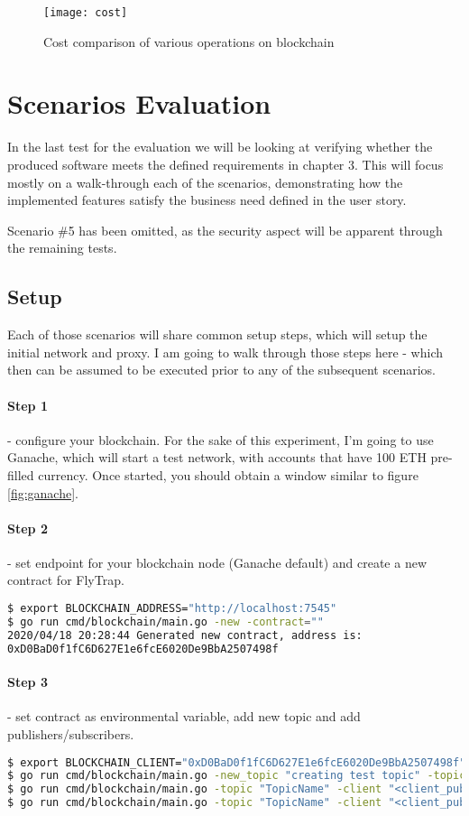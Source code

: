 \begin{figure}[h]
    \centering
    \texttt{[image: cost]}
    \caption{Cost comparison of various operations on blockchain}
    \label{fig:cost}
\end{figure}


\section{Scenarios Evaluation}
In the last test for the evaluation we will be looking at verifying whether the produced software meets the defined requirements in chapter 3. This will focus mostly on a walk-through each of the scenarios, demonstrating how the implemented features satisfy the business need defined in the user story.

Scenario \#5 has been omitted, as the security aspect will be apparent through the remaining tests.
\subsection{Setup}
Each of those scenarios will share common setup steps, which will setup the initial network and proxy. I am going to walk through those steps here - which then can be assumed to be executed prior to any of the subsequent scenarios.
\paragraph{Step 1} - configure your blockchain. For the sake of this experiment, I'm going to use Ganache, which will start a test network, with accounts that have 100 ETH pre-filled currency. Once started, you should obtain a window similar to figure \ref{fig:ganache}.
\paragraph{Step 2} - set endpoint for your blockchain node (Ganache default) and create a new contract for FlyTrap.
\begin{lstlisting}[language=bash]
$ export BLOCKCHAIN_ADDRESS="http://localhost:7545"
$ go run cmd/blockchain/main.go -new -contract=""
2020/04/18 20:28:44 Generated new contract, address is:
0xD0BaD0f1fC6D627E1e6fcE6020De9BbA2507498f
\end{lstlisting}
\paragraph{Step 3} - set contract as environmental variable, add new topic and add publishers/subscribers.
\begin{lstlisting}[language=bash,breaklines=true]
$ export BLOCKCHAIN_CLIENT="0xD0BaD0f1fC6D627E1e6fcE6020De9BbA2507498f"
$ go run cmd/blockchain/main.go -new_topic "creating test topic" -topic "TopicName"
$ go run cmd/blockchain/main.go -topic "TopicName" -client "<client_pubkey>" -pub "adding test publisher"
$ go run cmd/blockchain/main.go -topic "TopicName" -client "<client_pubkey>" -sub "adding test subscriber"
\end{lstlisting}
